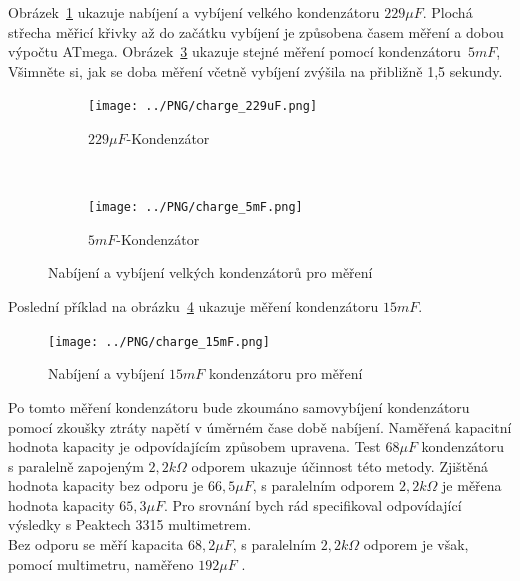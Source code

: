 Obrázek~\ref{pic:c229} ukazuje nabíjení a vybíjení velkého kondenzátoru \(229\mu F\).
Plochá střecha měřicí křivky až do začátku vybíjení je způsobena časem měření a dobou výpočtu ATmega.
Obrázek~\ref{pic:c5mF} ukazuje stejné měření pomocí kondenzátoru~\(5mF\),
Všimněte si, jak se doba měření včetně vybíjení zvýšila na přibližně 1,5 sekundy.
\begin{figure}[H]
  \begin{subfigure}[b]{.5\textwidth}
    \centering
    \texttt{[image: ../PNG/charge\_229uF.png]}
    \caption{\(229\mu F\)-Kondenzátor}
    \label{pic:c229}
  \end{subfigure}
  ~
  \begin{subfigure}[b]{.5\textwidth}
    \centering
    \texttt{[image: ../PNG/charge\_5mF.png]}
    \caption{\(5mF\)-Kondenzátor}
    \label{pic:c5mF}
  \end{subfigure}
  \caption{Nabíjení a vybíjení velkých kondenzátorů pro měření}
\end{figure}
Poslední příklad na obrázku~\ref{pic:c15mF} ukazuje měření kondenzátoru \(15mF\).
\begin{figure}[H]
  \centering
    \texttt{[image: ../PNG/charge\_15mF.png]}
  \caption{Nabíjení a vybíjení \(15mF\) kondenzátoru pro měření}
  \label{pic:c15mF}
\end{figure}

Po tomto měření kondenzátoru bude zkoumáno samovybíjení kondenzátoru pomocí
zkoušky ztráty napětí v úměrném čase době nabíjení.
Naměřená kapacitní hodnota kapacity je odpovídajícím způsobem upravena.
Test \(68\mu F\) kondenzátoru s paralelně zapojeným \(2,2k\Omega\) odporem ukazuje účinnost této metody.
Zjištěná hodnota kapacity bez odporu
je \(66,5\mu F\), s paralelním odporem \(2,2k\Omega\) je měřena hodnota kapacity \(65,3\mu F\).
Pro srovnání bych rád specifikoval odpovídající výsledky s Peaktech 3315 multimetrem.\\
Bez odporu se měří kapacita \(68,2\mu F\), s paralelním \(2,2k\Omega\) odporem je však,
pomocí multimetru, naměřeno \(192\mu F\)  .

